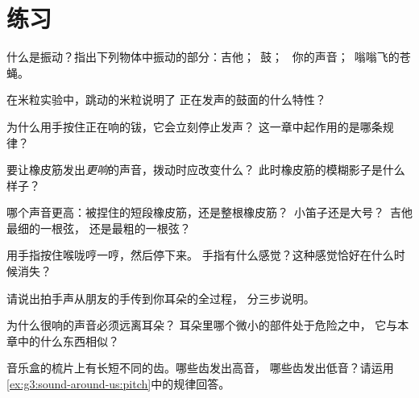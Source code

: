 \section{练习}

\begin{exercise}[$\star$]\label{exo:g3:sound-around-us:1}
什么是振动？指出下列物体中振动的部分：吉他；\ 鼓；
\ 你的声音；\ 嗡嗡飞的苍蝇。
\end{exercise}

\begin{exercise}[$\star$]\label{exo:g3:sound-around-us:2}
在米粒实验中，跳动的米粒说明了
正在发声的鼓面的什么特性？
\end{exercise}

\begin{exercise}[$\star$]\label{exo:g3:sound-around-us:3}
为什么用手按住正在响的钹，它会立刻停止发声？
这一章中起作用的是哪条规律？
\end{exercise}

\begin{exercise}[$\star$]\label{exo:g3:sound-around-us:4}
要让橡皮筋发出\emph{更响}的声音，拨动时应改变什么？
此时橡皮筋的模糊影子是什么样子？
\end{exercise}

\begin{exercise}[$\star$]\label{exo:g3:sound-around-us:5}
哪个声音更高：被捏住的短段橡皮筋，还是整根橡皮筋？\
小笛子还是大号？\ 吉他最细的一根弦，
还是最粗的一根弦？
\end{exercise}

\begin{exercise}[$\star$]\label{exo:g3:sound-around-us:6}
用手指按住喉咙哼一哼，然后停下来。
手指有什么感觉？这种感觉恰好在什么时候消失？
\end{exercise}

\begin{exercise}[$\star$]\label{exo:g3:sound-around-us:7}
请说出拍手声从朋友的手传到你耳朵的全过程，
分三步说明。
\end{exercise}

\begin{exercise}[$\star$]\label{exo:g3:sound-around-us:8}
为什么很响的声音必须远离耳朵？
耳朵里哪个微小的部件处于危险之中，
它与本章中的什么东西相似？
\end{exercise}

\begin{exercise}[$\star$]\label{exo:g3:sound-around-us:9}
音乐盒的梳片上有长短不同的齿。哪些齿发出高音，
哪些齿发出低音？请运用
\cref{ex:g3:sound-around-us:pitch}中的规律回答。
\end{exercise}

